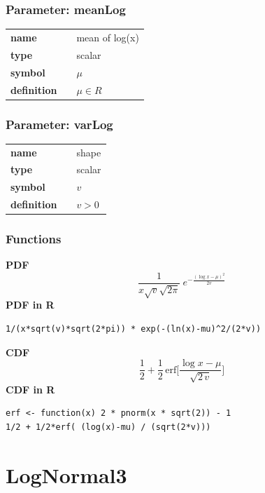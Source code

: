 \subsubsection*{Parameter: meanLog}

\noindent\begin{tabular}{p{2cm}cl}
\textbf{name} & & mean of log(x) \\
\textbf{type} & & scalar \\
\textbf{symbol} & & $\mu$  \\
\textbf{definition} & & $\mu \in R$
\end{tabular}
\subsubsection*{Parameter: varLog}

\noindent\begin{tabular}{p{2cm}cl}
\textbf{name} & & shape \\
\textbf{type} & & scalar \\
\textbf{symbol} & & $v$  \\
\textbf{definition} & & $v > 0$
\end{tabular}
\subsubsection*{Functions}

\smallskip \noindent \hspace{.2cm} \textbf{PDF} 
\begin{equation*}\frac{1}{x\sqrt{v}\sqrt{2\pi}}\ e^{-\frac{\left(\log x-\mu\right)^2}{2 v}}\end{equation*}
\smallskip \noindent \hspace{.2cm} \textbf{PDF in R}  
\begin{verbatim}1/(x*sqrt(v)*sqrt(2*pi)) * exp(-(ln(x)-mu)^2/(2*v))\end{verbatim}
\smallskip \noindent \hspace{.2cm} \textbf{CDF} 
\begin{equation*}\frac12 + \frac12\,\text{erf}\Big[\frac{\log x-\mu}{\sqrt{2\,v}}\Big]\end{equation*}
\smallskip \noindent \hspace{.2cm} \textbf{CDF in R}  
\begin{verbatim}
erf <- function(x) 2 * pnorm(x * sqrt(2)) - 1
1/2 + 1/2*erf( (log(x)-mu) / (sqrt(2*v)))\end{verbatim}
\smallskip\section*{LogNormal3} 

